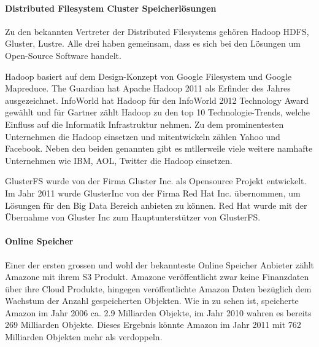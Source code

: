 \paragraph*{Distributed Filesystem Cluster Speicherlösungen}
Zu den bekannten Vertreter der Distributed Filesystems gehören Hadoop HDFS, Gluster, Lustre. Alle drei haben gemeinsam, dass es sich bei den Lösungen um Open-Source Software handelt.

Hadoop basiert auf dem Design-Konzept von Google Filesystem und Google Mapreduce. The Guardian hat Apache Hadoop 2011 als Erfinder des Jahres ausgezeichnet. InfoWorld hat Hadoop für den InfoWorld 2012 Technology Award gewählt und für Gartner zählt Hadoop zu den top 10 Technologie-Trends, welche Einfluss auf die Informatik Infrastruktur nehmen. 
Zu dem prominentesten Unternehmen die Hadoop einsetzen und mitentwickeln zählen Yahoo und Facebook. Neben den beiden genannten gibt es mtllerweile viele weitere namhafte Unternehmen wie IBM, AOL, Twitter die Hadoop einsetzen. \cite{Guardian}\cite{Wayner2012}\cite{Casonato2012}\cite{Hadoop2012}

GlusterFS wurde von der Firma Gluster Inc. als Opensource Projekt entwickelt. Im Jahr 2011 wurde GlusterInc von der Firma Red Hat Inc. übernommen, um Lösungen für den Big Data Bereich anbieten zu können. Red Hat wurde mit der Übernahme von Gluster Inc zum Hauptunterstützer von GlusterFS.

\paragraph*{Online Speicher}
Einer der ersten grossen und wohl der bekannteste Online Speicher Anbieter zählt Amazone mit ihrem S3 Produkt. Amazone veröffentlicht zwar keine Finanzdaten über ihre Cloud Produkte, hingegen veröffentlichte Amazon Daten bezüglich dem Wachstum der Anzahl gespeicherten Objekten. Wie in  zu sehen ist, speicherte Amazon im Jahr 2006 ca. 2.9 Milliarden Objekte, im Jahr 2010 wahren es bereits 269 Milliarden Objekte. Dieses Ergebnis könnte Amazon im Jahr 2011 mit 762 Milliarden Objekten mehr als verdoppeln. \cite{Barr2012}

